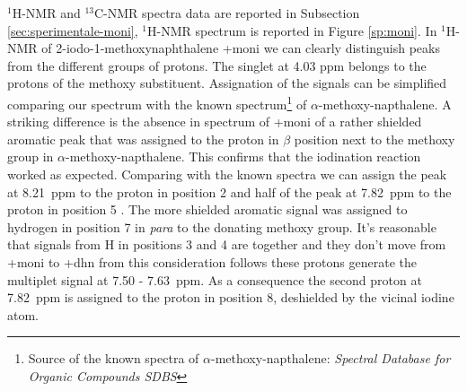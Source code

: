     $^1$H-NMR and $^{13}$C-NMR spectra data are reported in Subsection \ref{sec:sperimentale-moni}, $^1$H-NMR spectrum is reported in Figure \ref{sp:moni}.
    In $^1$H-NMR of 2-iodo-1-methoxy\-naphthalene \cmpd+{moni} we can clearly distinguish peaks from the different groups of protons. The singlet at 4.03 ppm belongs to the protons of the methoxy substituent. Assignation of the signals can be simplified comparing our spectrum with the known spectrum\footnote{Source of the known spectra of $\alpha$-meth\-oxy-napthalene: \emph{Spectral Database for Organic Compounds SDBS}} of $\alpha$-meth\-oxy-napthalene. A striking difference is the absence in spectrum of \cmpd+{moni} of a rather shielded aromatic peak that was assigned to the proton in $\beta$ position next to the meth\-oxy group in $\alpha$-meth\-oxy-napthalene. 
    This confirms that the iodination reaction worked as expected. Comparing with the known spectra we can assign the peak at 8.21~ppm to the proton in position 2 and half of the peak at 7.82~ppm to the proton in position 5%
. The more shielded aromatic signal was assigned to hydrogen in position 7 in \emph{para} to the donating methoxy group. It's reasonable that signals from H in positions 3 and 4 are together and they don't move from \cmpd+{moni} to \cmpd+{dhn} from this consideration follows these protons generate the multiplet signal at 7.50 - 7.63~ppm. As a consequence the second proton at 7.82~ppm is assigned to the proton in position 8, de\-shielded by the vicinal iodine atom. 
    


